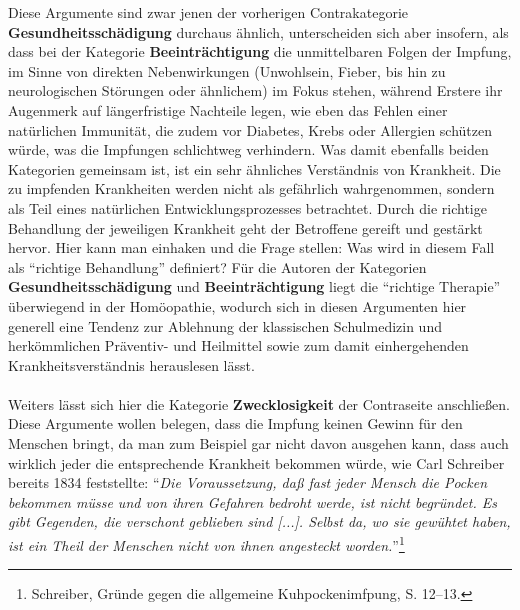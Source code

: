 \documentclass[
    a4paper,
    12pt,
    hyphens,
    chapterprefix=true,
    headheight=33pt,
    footheight=29pt,
    headings=optiontohead, %
]{scrartcl}
\begin{document}
{Diese Argumente sind zwar jenen der vorherigen Contrakategorie \textbf{Gesundheitsschädigung} durchaus ähnlich, unterscheiden sich aber insofern, als dass bei der Kategorie \textbf{Beeinträchtigung} die unmittelbaren Folgen der Impfung, im Sinne von direkten Nebenwirkungen (Unwohlsein, Fieber, bis hin zu neurologischen Störungen oder ähnlichem) im Fokus stehen, während Erstere ihr Augenmerk auf längerfristige Nachteile legen, wie eben das Fehlen einer natürlichen Immunität, die zudem vor Diabetes, Krebs oder Allergien schützen würde, was die Impfungen schlichtweg verhindern. Was damit ebenfalls beiden Kategorien gemeinsam ist, ist ein sehr ähnliches Verständnis von Krankheit. Die zu impfenden Krankheiten werden nicht als gefährlich wahrgenommen, sondern als Teil eines natürlichen Entwicklungsprozesses betrachtet. Durch die richtige Behandlung der jeweiligen Krankheit geht der Betroffene gereift und gestärkt hervor. Hier kann man einhaken und die Frage stellen: Was wird in diesem Fall als "`richtige Behandlung"' definiert? Für die Autoren der Kategorien \textbf{Gesundheitsschädigung} und \textbf{Beeinträchtigung} liegt die "`richtige Therapie"' überwiegend in der Homöopathie, wodurch sich in diesen Argumenten hier generell eine Tendenz zur Ablehnung der klassischen Schulmedizin und herkömmlichen Präventiv- und Heilmittel sowie zum damit einhergehenden Krankheitsverständnis herauslesen lässt.\\
\\
Weiters lässt sich hier die Kategorie \textbf{Zwecklosigkeit} der Contraseite anschließen. Diese Argumente wollen belegen, dass die Impfung keinen Gewinn für den Menschen bringt, da man zum Beispiel gar nicht davon ausgehen kann, dass auch wirklich jeder die entsprechende Krankheit bekommen würde, wie Carl Schreiber bereits 1834 feststellte: "`\textit{Die Voraussetzung, daß fast jeder Mensch die Pocken bekommen müsse und von ihren Gefahren bedroht werde, ist nicht begründet. Es gibt Gegenden, die verschont geblieben sind [...]. Selbst da, wo sie gewühtet haben, ist ein Theil der Menschen nicht von ihnen angesteckt worden.}"'\footnote{Schreiber, Gründe gegen die allgemeine Kuhpockenimfpung,  S. 12--13.}\\
}
\end{document}
